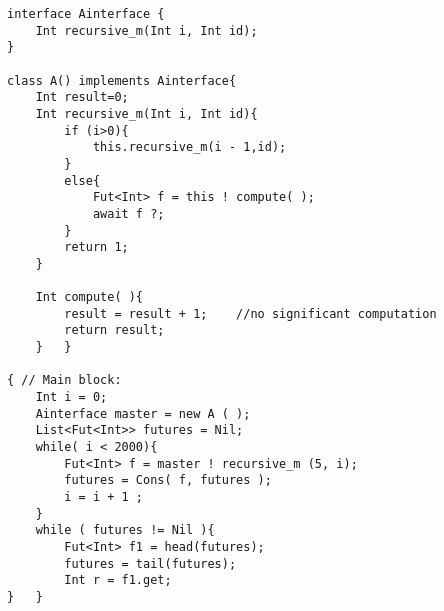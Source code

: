 %
\begin{lstlisting}[caption= Benchmark Example, label=absex]
interface Ainterface {
	Int recursive_m(Int i, Int id);
}

class A() implements Ainterface{
	Int result=0;
	Int recursive_m(Int i, Int id){
		if (i>0){
			this.recursive_m(i - 1,id);	
		}
		else{
			Fut<Int> f = this ! compute( );
			await f ?;
		}
		return 1;
	}
	
	Int compute( ){
		result = result + 1;	//no significant computation
		return result;
	}	}

{ // Main block:
	Int i = 0;	
	Ainterface master = new A ( );
	List<Fut<Int>> futures = Nil;	
	while( i < 2000){		
		Fut<Int> f = master ! recursive_m (5, i);
		futures = Cons( f, futures );
		i = i + 1 ;
	}
	while ( futures != Nil ){
		Fut<Int> f1 = head(futures);
		futures = tail(futures);
		Int r = f1.get;
}	}
\end{lstlisting}



